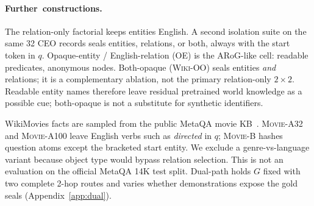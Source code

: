 \documentclass[10pt]{article} %
\begin{document}
\paragraph{\mbox{Further constructions.}}
The relation-only factorial keeps entities English. A second isolation suite
on the same 32 CEO records seals entities, relations, or both, always with
the start token in $q$. Opaque-entity / English-relation (OE) is the
ARoG-like cell: readable predicates, anonymous nodes. Both-opaque
(\textsc{Wiki-OO}) seals entities \emph{and} relations; it is a
complementary ablation, not the primary relation-only $2{\times}2$. Readable
entity names therefore leave residual pretrained world knowledge as a
possible cue; both-opaque is not a substitute for synthetic identifiers.

WikiMovies facts are sampled from the public MetaQA movie
KB~\citep{miller2016wikimovies,zhang2018metaqa}.
\textsc{Movie-A32} and \textsc{Movie-A100} leave English verbs such as
\emph{directed} in $q$;
\textsc{Movie-B} hashes question atoms except the bracketed start entity.
We exclude a genre-vs-language variant because object type would bypass
relation selection. This is not an evaluation on the official MetaQA 14K
test split. Dual-path holds $G$ fixed with two complete 2-hop routes and
varies whether demonstrations expose the gold seals
(Appendix~\ref{app:dual}).
\end{document}
